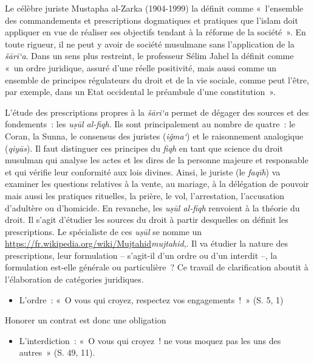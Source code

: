 Le célèbre juriste Mustapha al-Zarka (1904-1999) la définit comme
«~l'ensemble des commandements et prescriptions dogmatiques et pratiques
que l'islam doit appliquer en vue de réaliser ses objectifs tendant à la
réforme de la société~». En toute rigueur, il ne peut y avoir de société musulmane sans
l'application de la \emph{šāri`a}. Dans un sens plus restreint, le
professeur Sélim Jahel la définit comme «~un ordre juridique, assuré
d'une réelle positivité, mais aussi comme un ensemble de principes
régulateurs du droit et de la vie sociale, comme peut l'être, par
exemple, dans un Etat occidental le préambule d'une
constitution~».

L'étude des prescriptions propres à la \emph{šāri`a} permet de dégager
des sources et des fondements~: les \emph{uṣūl al-fiqh}. Ils sont
principalement au nombre de quatre~: le Coran, la Sunna, le consensus
des juristes (\emph{iǧma`}) et le raisonnement analogique
(\emph{qiyās}). Il faut distinguer ces principes du \emph{fiqh} en tant
que science du droit musulman qui analyse les actes et les dires de la
personne majeure et responsable et qui vérifie leur conformité aux lois
divines. Ainsi, le juriste (le \emph{faqīh}) va examiner les questions
relatives à la vente, au mariage, à la délégation de pouvoir mais aussi
les pratiques rituelles, la prière, le vol, l'arrestation, l'accusation
d'adultère ou d'homicide. En revanche, les \emph{uṣūl al-fiqh} renvoient
à la théorie du droit. Il s'agit d'étudier les sources du droit à partir
desquelles on définit les prescriptions. Le spécialiste de ces
\emph{uṣūl} se nomme un
\url{https://fr.wikipedia.org/wiki/Mujtahid}{\emph{mujtahid}},. Il va
étudier la nature des prescriptions, leur formulation -- s'agit-il d'un
ordre ou d'un interdit --, la formulation est-elle générale ou
particulière~? Ce travail de clarification aboutit à l'élaboration de
catégories juridiques.

\begin{itemize}
\item
  L'ordre~: «~O vous qui croyez, respectez vos engagements~!~» (S. 5, 1)
\end{itemize}

Honorer un contrat est donc une obligation

\begin{itemize}
\item
  L'interdiction~: «~O vous qui croyez~! ne vous moquez pas les uns des
  autres~» (S. 49, 11).
\end{itemize}

